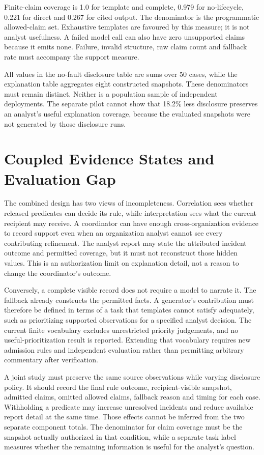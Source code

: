 Finite-claim coverage is 1.0 for template and complete, 0.979 for no-lifecycle, 0.221 for direct and 0.267 for cited output. The denominator is the programmatic allowed-claim set. Exhaustive templates are favoured by this measure; it is not analyst usefulness. A failed model call can also have zero unsupported claims because it emits none. Failure, invalid structure, raw claim count and fallback rate must accompany the support measure.

All values in the no-fault disclosure table are sums over 50 cases, while the explanation table aggregates eight constructed snapshots. These denominators must remain distinct. Neither is a population sample of independent deployments. The separate pilot cannot show that 18.2\% less disclosure preserves an analyst's useful explanation coverage, because the evaluated snapshots were not generated by those disclosure runs.

\section{Coupled Evidence States and Evaluation Gap}
The combined design has two views of incompleteness. Correlation sees whether released predicates can decide its rule, while interpretation sees what the current recipient may receive. A coordinator can have enough cross-organization evidence to record support even when an organization analyst cannot see every contributing refinement. The analyst report may state the attributed incident outcome and permitted coverage, but it must not reconstruct those hidden values. This is an authorization limit on explanation detail, not a reason to change the coordinator's outcome.

Conversely, a complete visible record does not require a model to narrate it. The fallback already constructs the permitted facts. A generator's contribution must therefore be defined in terms of a task that templates cannot satisfy adequately, such as prioritizing supported observations for a specified analyst decision. The current finite vocabulary excludes unrestricted priority judgements, and no useful-prioritization result is reported. Extending that vocabulary requires new admission rules and independent evaluation rather than permitting arbitrary commentary after verification.

A joint study must preserve the same source observations while varying disclosure policy. It should record the final rule outcome, recipient-visible snapshot, admitted claims, omitted allowed claims, fallback reason and timing for each case. Withholding a predicate may increase unresolved incidents and reduce available report detail at the same time. Those effects cannot be inferred from the two separate component totals. The denominator for claim coverage must be the snapshot actually authorized in that condition, while a separate task label measures whether the remaining information is useful for the analyst's question.

